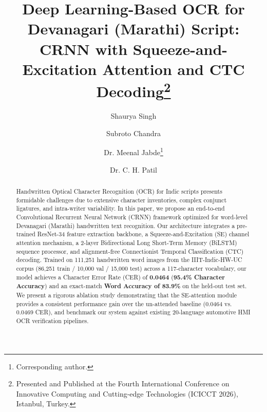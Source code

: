 \documentclass[runningheads]{llncs}
\begin{document}
\title{Deep Learning-Based OCR for Devanagari (Marathi) Script: CRNN with Squeeze-and-Excitation Attention and CTC Decoding\thanks{Presented and Published at the Fourth International Conference on Innovative Computing and Cutting-edge Technologies (ICICCT 2026), Istanbul, Turkey.}}

\author{Shaurya Singh \and Subroto Chandra \and Dr. Meenal Jabde\thanks{Corresponding author.} \and Dr. C. H. Patil\footnotemark[2]}


\maketitle

\begin{abstract}
Handwritten Optical Character Recognition (OCR) for Indic scripts presents formidable challenges due to extensive character inventories, complex conjunct ligatures, and intra-writer variability. In this paper, we propose an end-to-end Convolutional Recurrent Neural Network (CRNN) framework optimized for word-level Devanagari (Marathi) handwritten text recognition. Our architecture integrates a pre-trained ResNet-34 feature extraction backbone, a Squeeze-and-Excitation (SE) channel attention mechanism, a 2-layer Bidirectional Long Short-Term Memory (BiLSTM) sequence processor, and alignment-free Connectionist Temporal Classification (CTC) decoding. Trained on 111,251 handwritten word images from the IIIT-Indic-HW-UC corpus (86,251 train / 10,000 val / 15,000 test) across a 117-character vocabulary, our model achieves a Character Error Rate (CER) of \textbf{0.0464} (\textbf{95.4\% Character Accuracy}) and an exact-match \textbf{Word Accuracy of 83.9\%} on the held-out test set. We present a rigorous ablation study demonstrating that the SE-attention module provides a consistent performance gain over the un-attended baseline (0.0464 vs. 0.0469 CER), and benchmark our system against existing 20-language automotive HMI OCR verification pipelines.

\end{abstract}
\end{document}
